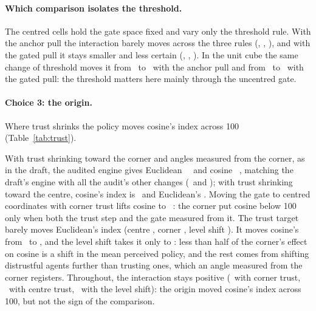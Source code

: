 \documentclass[11pt]{article}
\begin{document}
\paragraph{Which comparison isolates the threshold.}
The centred cells hold the gate space fixed and vary only the threshold rule.
With the anchor pull the interaction barely moves across the three rules (\VFCentredRawAnchorInter, \VFCentredMatchedAnchorInter, \VFCentredRunAnchorInter), and with the gated pull it stays smaller and less certain (\VFCentredRawGatedInter, \VFCentredMatchedGatedInter, \VFCentredRunGatedInter).
In the unit cube the same change of threshold moves it from \VFUnitRawAnchorInter\ to \VFUnitRunAnchorInter\ with the anchor pull and from \VFUnitRawGatedInter\ to \VFUnitRunGatedInter\ with the gated pull: the threshold matters here mainly through the uncentred gate.

\paragraph{Choice 3: the origin.}
Where trust shrinks the policy moves cosine's index across 100 (Table~\ref{tab:trust}).

\begin{table}[t]
\centering\small
\caption{Trust targets with the draft's shared threshold and gated pull: lag index (lag 0 $=100$, relative shock effect, 95\% CI) per geometry, relative shock effect at lags 0 and 40 for Euclidean (E) and cosine (C), and the paired interaction; $^{=}$ marks equivalence to zero. Level shift: centre shrinkage plus the same shift, $-(1-\bar\tau)$, for every agent. The unit-gate status quo and own-opinion rows come from the target sweep.}
\label{tab:trust}

\end{table}
With trust shrinking toward the corner and angles measured from the corner, as in the draft, the audited engine gives Euclidean \VTUnitRawCornerEucIdx\ \VTUnitRawCornerEucIdxCI\ and cosine \VTUnitRawCornerCosIdx\ \VTUnitRawCornerCosIdxCI, matching the draft's engine with all the audit's other changes (\VCDraftFixedEucIdx\ and \VCDraftFixedCosIdx); with trust shrinking toward the centre, cosine's index is \VTUnitRawCentreCosIdx\ and Euclidean's \VTUnitRawCentreEucIdx.
Moving the gate to centred coordinates with corner trust lifts cosine to \VTCentredRawCornerCosIdx\ \VTCentredRawCornerCosIdxCI: the corner put cosine below 100 only when both the trust step and the gate measured from it.
The trust target barely moves Euclidean's index (centre \VTUnitRawCentreEucIdx, corner \VTUnitRawCornerEucIdx, level shift \VTUnitRawLevelShiftEucIdx).
It moves cosine's from \VTUnitRawCentreCosIdx\ to \VTUnitRawCornerCosIdx, and the level shift takes it only to \VTUnitRawLevelShiftCosIdx: less than half of the corner's effect on cosine is a shift in the mean perceived policy, and the rest comes from shifting distrustful agents further than trusting ones, which an angle measured from the corner registers.
Throughout, the interaction stays positive (\VTUnitRawCornerInter\ with corner trust, \VTUnitRawCentreInter\ with centre trust, \VTUnitRawLevelShiftInter\ with the level shift): the origin moved cosine's index across 100, but not the sign of the comparison.
\end{document}
